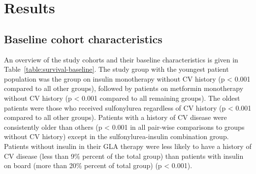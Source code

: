\section{Results}

\subsection{Baseline cohort characteristics}
An overview of the study cohorts and their baseline characteristics is given in Table~\ref{table:survival-baseline}. The study group with the youngest patient population was the group on insulin monotherapy without CV history (p < 0.001 compared to all other groups), followed by patients on metformin monotherapy without CV history (p < 0.001 compared to all remaining groups). The oldest patients were those who received sulfonylurea regardless of CV history (p < 0.001 compared to all other groups). Patients with a history of CV disease were consistently older than others (p < 0.001 in all pair-wise comparisons to groups without CV history) except in the sulfonylurea-insulin combination group. 
Patients without insulin in their GLA therapy were less likely to have a history of CV disease (less than 9\% percent of the total group) than patients with insulin on board (more than 20\% percent of total group) (p < 0.001). 

